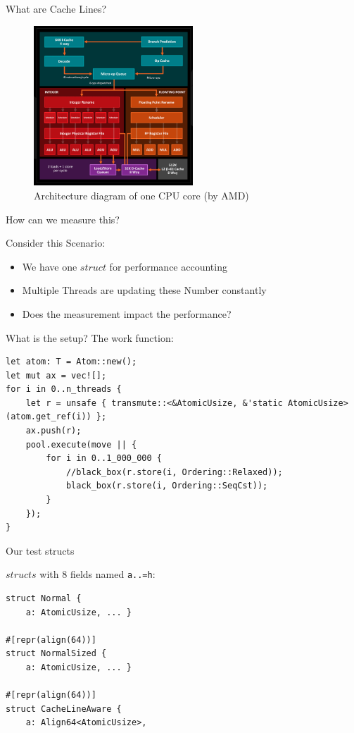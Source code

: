 \documentclass[10pt,aspectratio=169]{beamer}
\begin{document}
\begin{frame}{What are Cache Lines?}

\begin{figure}
    \includegraphics[height=6cm]{./cpu_core_architecture_diagram.png}
    \caption{Architecture diagram of one CPU core (by AMD)}
\end{figure}
\end{frame}


\begin{frame}{How can we measure this?}

    Consider this Scenario:
    \begin{itemize}
        \item We have one $struct$ for performance accounting
        \item Multiple Threads are updating these Number constantly
        \item Does the measurement impact the performance?
    \end{itemize}
\end{frame}

\begin{frame}[fragile]{What is the setup?}
The work function:
\begin{verbatim}
let atom: T = Atom::new();
let mut ax = vec![];
for i in 0..n_threads {
    let r = unsafe { transmute::<&AtomicUsize, &'static AtomicUsize>(atom.get_ref(i)) };
    ax.push(r);
    pool.execute(move || {
        for i in 0..1_000_000 {
            //black_box(r.store(i, Ordering::Relaxed));
            black_box(r.store(i, Ordering::SeqCst));
        }
    });
}
\end{verbatim}
\end{frame}

\begin{frame}[fragile]{Our test structs}

$structs$ with 8 fields named \texttt{a..=h}:

\begin{verbatim}
struct Normal {
    a: AtomicUsize, ... }

#[repr(align(64))]
struct NormalSized {
    a: AtomicUsize, ... }

#[repr(align(64))]
struct CacheLineAware {
    a: Align64<AtomicUsize>,
\end{verbatim}
\end{frame}
\end{document}
